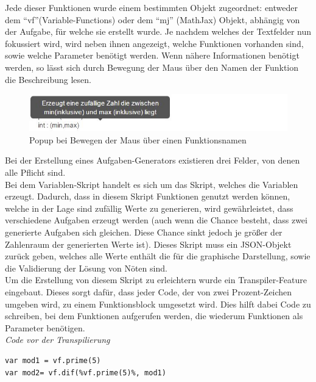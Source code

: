 Jede dieser Funktionen wurde einem bestimmten Objekt zugeordnet: entweder dem ``vf''(Variable-Functions) oder dem ``mj'' (MathJax) Objekt,  abhängig von der Aufgabe, für welche sie erstellt wurde. Je nachdem welches der Textfelder nun fokussiert wird, wird neben ihnen angezeigt, welche Funktionen vorhanden sind, sowie welche Parameter benötigt werden. Wenn nähere Informationen benötigt werden, so lässt sich durch Bewegung der Maus über den Namen der Funktion die Beschreibung lesen.\\

\begin{figure}[htp]     %
\centering
\includegraphics[width=1\textwidth]{bilder/MouseOver} 
\caption[Popup bei Bewegen der Maus über einen Funktionsnamen]{Popup bei Bewegen der Maus über einen Funktionsnamen}
\end{figure} 

Bei der Erstellung eines Aufgaben-Generators existieren drei Felder, von denen alle Pflicht sind. \\

Bei dem Variablen-Skript handelt es sich um das Skript, welches die Variablen erzeugt. Dadurch, dass in diesem Skript Funktionen genutzt werden können, welche in der Lage sind zufällig Werte zu generieren, wird gewährleistet, dass verschiedene Aufgaben erzeugt werden (auch wenn die Chance besteht, dass zwei generierte Aufgaben sich gleichen. Diese Chance sinkt jedoch je größer der Zahlenraum der generierten Werte ist). Dieses Skript muss ein JSON-Objekt zurück geben, welches alle Werte enthält die für die graphische Darstellung, sowie die Validierung der Lösung von Nöten sind. \\
Um die Erstellung von diesem Skript zu erleichtern wurde ein Transpiler-Feature eingebaut. Dieses sorgt dafür, dass jeder Code, der von zwei Prozent-Zeichen umgeben wird, zu einem Funktionsblock umgesetzt wird. Dies hilft dabei Code zu schreiben, bei dem Funktionen aufgerufen werden, die wiederum Funktionen als Parameter benötigen.\\


\emph{Code vor der Transpilierung}
\begin{lstlisting}
var mod1 = vf.prime(5)
var mod2= vf.dif(%vf.prime(5)%, mod1)
\end{lstlisting}


